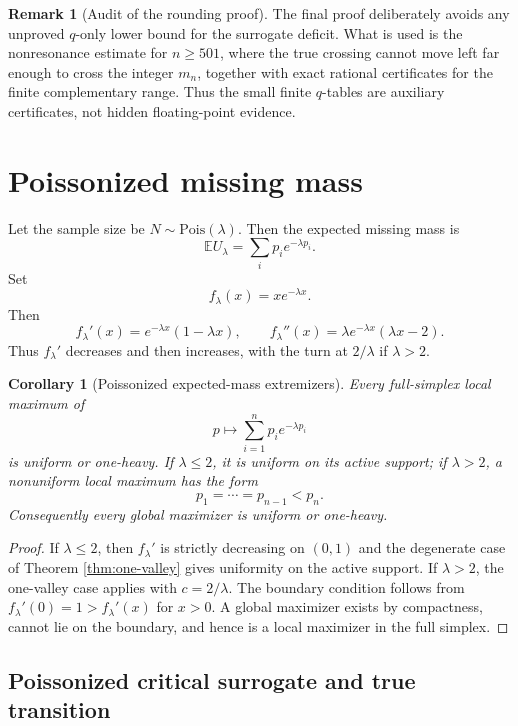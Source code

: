 \documentclass[11pt]{article}
\newtheorem{corollary}[theorem]{Corollary}
\theoremstyle{definition}
\newtheorem{remark}[theorem]{Remark}
\newcommand{\E}{\mathbb E}
\newcommand{\Pois}{\mathrm{Pois}}
\begin{document}
\begin{remark}[Audit of the rounding proof]
The final proof deliberately avoids any unproved \(q\)-only lower bound for the
surrogate deficit.  What is used is the nonresonance estimate for \(n\ge501\),
where the true crossing cannot move left far enough to cross the integer
\(m_n\), together with exact rational certificates for the finite complementary
range.  Thus the small finite \(q\)-tables are auxiliary certificates, not hidden
floating-point evidence.
\end{remark}



\section{Poissonized missing mass}

Let the sample size be $N\sim\Pois(\lambda)$. Then the expected missing mass is
\[
  \E U_\lambda=\sum_i p_i e^{-\lambda p_i}.
\]
Set
\[
  f_\lambda(x)=xe^{-\lambda x}.
\]
Then
\[
  f_\lambda'(x)=e^{-\lambda x}(1-\lambda x),
  \qquad
  f_\lambda''(x)=\lambda e^{-\lambda x}(\lambda x-2).
\]
Thus $f_\lambda'$ decreases and then increases, with the turn at $2/\lambda$ if $\lambda>2$.

\begin{corollary}[Poissonized expected-mass extremizers]\label{cor:poisson-exp}
Every full-simplex local maximum of
\[
  p\mapsto\sum_{i=1}^n p_i e^{-\lambda p_i}
\]
is uniform or one-heavy. If $\lambda\le 2$, it is uniform on its active support; if $\lambda>2$, a nonuniform local maximum has the form
\[
  p_1=\cdots=p_{n-1}<p_n.
\]
Consequently every global maximizer is uniform or one-heavy.
\end{corollary}

\begin{proof}
If $\lambda\le 2$, then $f_\lambda'$ is strictly decreasing on $(0,1)$ and the degenerate case of Theorem \ref{thm:one-valley} gives uniformity on the active support. If $\lambda>2$, the one-valley case applies with $c=2/\lambda$. The boundary condition follows from $f_\lambda'(0)=1>f_\lambda'(x)$ for $x>0$. A global maximizer exists by compactness, cannot lie on the boundary, and hence is a local maximizer in the full simplex.
\end{proof}

\subsection{Poissonized critical surrogate and true transition}
\end{document}
